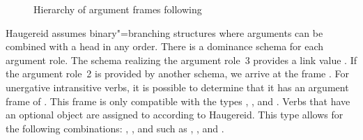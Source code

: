 \begin{exe}
\begin{xlist}[iv.]
\begin{exe}
\begin{xlist}[iv.]
\begin{figure}
{}
\caption{\label{Abbildung-Haugereid}Hierarchy of argument frames following \citet{Haugereid2007a}}
\end{figure}%
Haugereid assumes binary"=branching structures where arguments can be combined with a head in any order.
There is a dominance schema for each argument role. The schema realizing the argument role~3 provides a link value .
If the argument role~2 is provided by another schema, we arrive at the frame
. For unergative intransitive verbs, it is possible to determine that it has an argument frame of 
. This frame is only compatible with the types , ,
 and . Verbs that have an optional object are assigned to  according to Haugereid.
This type allows for the following combinations: , ,
 and  such as , ,  and .


\end{xlist}
\end{exe}
\end{xlist}
\end{exe}
